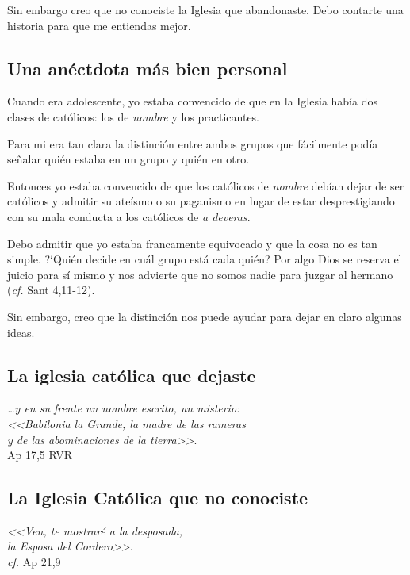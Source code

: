 \documentclass{article}
\begin{document}
Sin embargo creo que no conociste la Iglesia que abandonaste. Debo contarte una historia para que me entiendas mejor.

\subsection{Una an\'ectdota m\'as bien personal}

Cuando era adolescente, yo estaba convencido de que en la Iglesia hab\'{i}a dos clases de cat\'olicos: los de \emph{nombre} y los practicantes.

Para mi era tan clara la distinci\'on entre ambos grupos que f\'acilmente pod\'{i}a se\~nalar qui\'en estaba en un grupo y qui\'en en otro.

Entonces yo estaba convencido de que los cat\'olicos de \emph{nombre} deb\'{i}an dejar de ser cat\'olicos y admitir su ate\'{i}smo o su paganismo en lugar de estar desprestigiando con su mala conducta a los cat\'olicos de \emph{a deveras}.

Debo admitir que yo estaba francamente equivocado y que la cosa no es tan simple. ?`Qui\'en decide en cu\'al grupo est\'a cada qui\'en? Por algo Dios se reserva el juicio para s\'{i} mismo y nos advierte que no somos nadie para juzgar al hermano (\emph{cf.} Sant 4,11-12).

Sin embargo, creo que la distinci\'on nos puede ayudar para dejar en claro algunas ideas.

\subsection{La iglesia cat\'olica que dejaste}

\begin{flushright}
\emph{{\ldots}y en su frente un nombre escrito, un misterio:\\
<<Babilonia la Grande, la madre de las rameras\\
y de las abominaciones de la tierra>>}.\\
Ap 17,5 RVR
\end{flushright}

\subsection{La Iglesia Cat\'olica que no conociste}

\begin{flushright}
\emph{<<Ven, te mostrar\'e a la desposada,\\
la Esposa del Cordero>>}.\\
\emph{cf.} Ap 21,9
\end{flushright}
\end{document}
